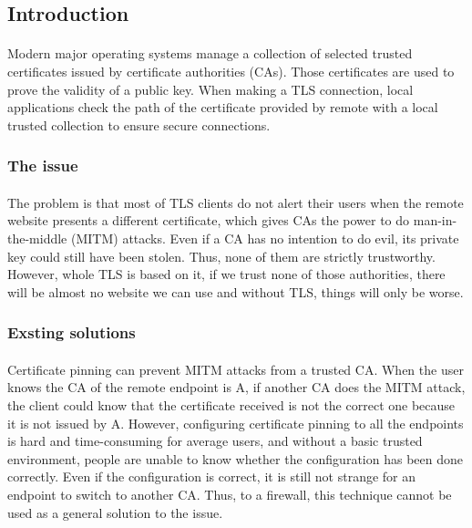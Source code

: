 \documentclass[mscthesis]{usiinfthesis}
\begin{document}
\subsection{Introduction}
\paragraph{}
Modern major operating systems manage a collection of selected trusted certificates issued by certificate authorities (CAs). Those certificates are used to prove the validity of a public key. When making a TLS connection, local applications check the path of the certificate provided by remote with a local trusted collection to ensure secure connections.
\subsubsection{The issue}
\paragraph{}
The problem is that most of TLS clients do not alert their users when the remote website presents a different certificate, which gives CAs the power to do man-in-the-middle (MITM) attacks. Even if a CA has no intention to do evil, its private key could still have been stolen. Thus, none of them are strictly trustworthy. However, whole TLS is based on it, if we trust none of those authorities, there will be almost no website we can use and without TLS, things will only be worse.
\subsubsection{Exsting solutions}
\paragraph{}
Certificate pinning can prevent MITM attacks from a trusted CA. When the user knows the CA of the remote endpoint is A, if another CA does the MITM attack, the client could know that the certificate received is not the correct one because it is not issued by A. However, configuring certificate pinning to all the endpoints is hard and time-consuming for average users, and without a basic trusted environment, people are unable to know whether the configuration has been done correctly. Even if the configuration is correct, it is still not strange for an endpoint to switch to another CA. Thus, to a firewall, this technique cannot be used as a general solution to the issue.
\end{document}
